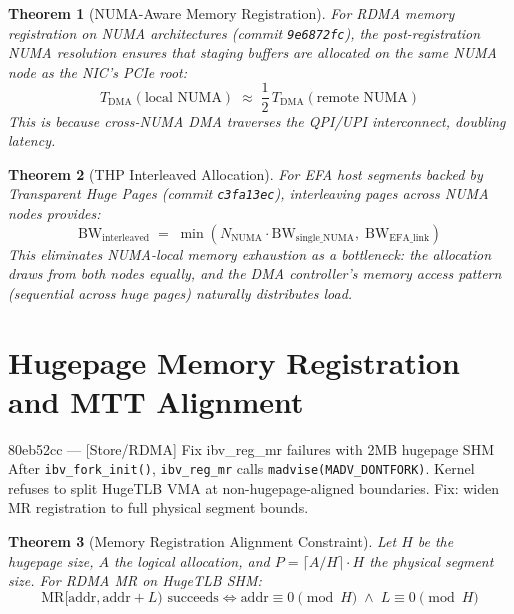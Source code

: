 \documentclass[11pt,a4paper,twoside]{article}
\theoremstyle{plain}
\newtheorem{theorem}{Theorem}[section]
\theoremstyle{definition}
\theoremstyle{remark}
\begin{document}
\begin{theorem}[NUMA-Aware Memory Registration]
\label{thm:numa-mr}
For RDMA memory registration on NUMA architectures (commit \texttt{9e6872fc}),
the post-registration NUMA resolution ensures that staging buffers are allocated
on the same NUMA node as the NIC's PCIe root:
\begin{equation}
  T_{\text{DMA}}(\text{local NUMA}) \;\approx\; \frac{1}{2}\,T_{\text{DMA}}(\text{remote NUMA})
\end{equation}
This is because cross-NUMA DMA traverses the QPI/UPI interconnect, doubling latency.
\end{theorem}

\begin{theorem}[THP Interleaved Allocation]
\label{thm:thp-interleave}
For EFA host segments backed by Transparent Huge Pages (commit \texttt{c3fa13ec}),
interleaving pages across NUMA nodes provides:
\begin{equation}
  \text{BW}_{\text{interleaved}} \;=\; \min\!\left(
    N_{\text{NUMA}} \cdot \text{BW}_{\text{single\_NUMA}},\;
    \text{BW}_{\text{EFA\_link}}
  \right)
\end{equation}
This eliminates NUMA-local memory exhaustion as a bottleneck: the allocation
draws from both nodes equally, and the DMA controller's memory access pattern
(sequential across huge pages) naturally distributes load.
\end{theorem}


\section{Hugepage Memory Registration and MTT Alignment}
\label{sec:hugepage}

\begin{commitbox}{80eb52cc --- [Store/RDMA] Fix ibv\_reg\_mr failures with 2MB hugepage SHM}
After \texttt{ibv\_fork\_init()}, \texttt{ibv\_reg\_mr} calls \texttt{madvise(MADV\_DONTFORK)}.
Kernel refuses to split HugeTLB VMA at non-hugepage-aligned boundaries.
Fix: widen MR registration to full physical segment bounds.
\end{commitbox}

\begin{theorem}[Memory Registration Alignment Constraint]
\label{thm:mtt-align}
Let $H$ be the hugepage size, $A$ the logical allocation, and
$P = \lceil A/H \rceil \cdot H$ the physical segment size.  For RDMA MR on HugeTLB SHM:
\begin{equation}
  \text{MR}[\text{addr}, \text{addr} + L) \text{ succeeds} \iff
  \text{addr} \equiv 0 \pmod{H} \;\land\; L \equiv 0 \pmod{H}
\end{equation}
\end{theorem}
\end{document}
